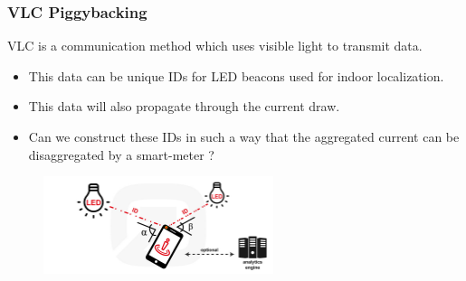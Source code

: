 \documentclass{beamer}
\begin{document}
	\begin{frame}\frametitle{VLC Piggybacking}

		VLC is a communication method which uses visible light to transmit data.

		\begin{itemize}

			\item This data can be unique IDs for LED beacons used for indoor localization.

			\item This data will also propagate through the current draw.

			\item Can we construct these IDs in such a way that the aggregated current can be disaggregated by a smart-meter ?

		\end{itemize}


		\begin{figure}
			\centering
			\includegraphics[width=0.6\textwidth]{vlc-indoor-positioning.jpg}
		\end{figure}



	\end{frame}
\end{document}
